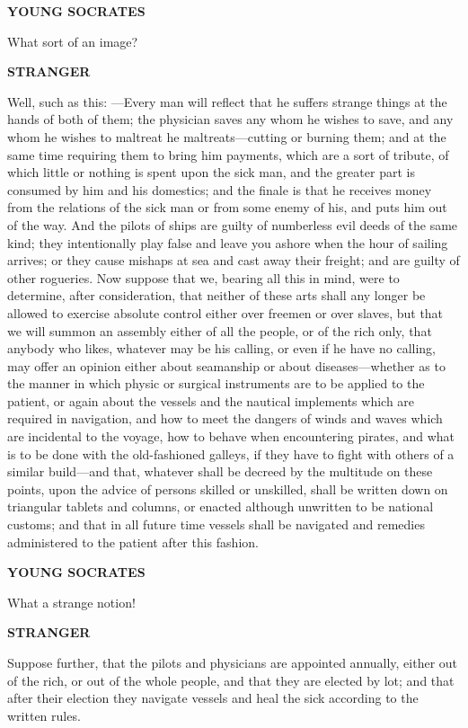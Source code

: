\documentclass[11pt,letter]{article}
\begin{document}
\par \textbf{YOUNG SOCRATES}
\par   What sort of an image?

\par \textbf{STRANGER}
\par   Well, such as this: —Every man will reflect that he suffers strange things at the hands of both of them; the physician saves any whom he wishes to save, and any whom he wishes to maltreat he maltreats—cutting or burning them; and at the same time requiring them to bring him payments, which are a sort of tribute, of which little or nothing is spent upon the sick man, and the greater part is consumed by him and his domestics; and the finale is that he receives money from the relations of the sick man or from some enemy of his, and puts him out of the way. And the pilots of ships are guilty of numberless evil deeds of the same kind; they intentionally play false and leave you ashore when the hour of sailing arrives; or they cause mishaps at sea and cast away their freight; and are guilty of other rogueries. Now suppose that we, bearing all this in mind, were to determine, after consideration, that neither of these arts shall any longer be allowed to exercise absolute control either over freemen or over slaves, but that we will summon an assembly either of all the people, or of the rich only, that anybody who likes, whatever may be his calling, or even if he have no calling, may offer an opinion either about seamanship or about diseases—whether as to the manner in which physic or surgical instruments are to be applied to the patient, or again about the vessels and the nautical implements which are required in navigation, and how to meet the dangers of winds and waves which are incidental to the voyage, how to behave when encountering pirates, and what is to be done with the old-fashioned galleys, if they have to fight with others of a similar build—and that, whatever shall be decreed by the multitude on these points, upon the advice of persons skilled or unskilled, shall be written down on triangular tablets and columns, or enacted although unwritten to be national customs; and that in all future time vessels shall be navigated and remedies administered to the patient after this fashion.

\par \textbf{YOUNG SOCRATES}
\par   What a strange notion!

\par \textbf{STRANGER}
\par   Suppose further, that the pilots and physicians are appointed annually, either out of the rich, or out of the whole people, and that they are elected by lot; and that after their election they navigate vessels and heal the sick according to the written rules.
\end{document}

